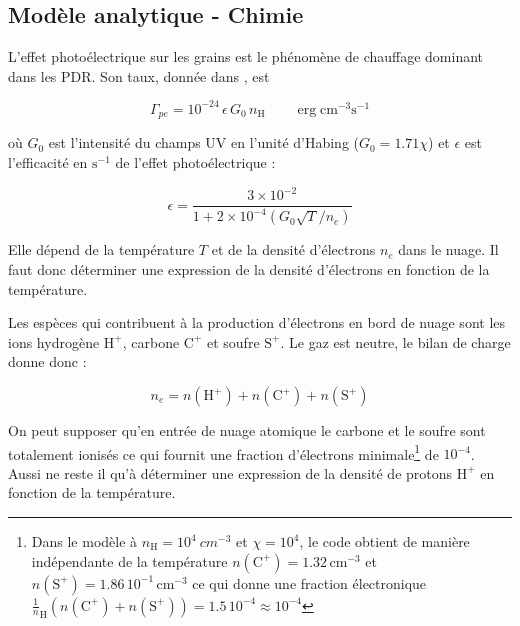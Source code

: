 \subsection{Modèle analytique - Chimie}

L'effet photoélectrique sur les grains est le phénomène de chauffage dominant dans les PDR. Son taux, donnée dans \cite{BakesTielens1994}, est 

\begin{equation}
    \Gamma_{pe} = 10^{-24}\,\epsilon\,G_0\, n_{\mathrm{H}} \qquad \operatorname{erg} \mathrm{cm}^{-3} \mathrm{s}^{-1}
\end{equation} 

où $G_0$ est l'intensité du champs UV en l'unité d'Habing ($G_0 = 1.71\chi$) et $\epsilon$ est l'efficacité en $\mathrm{s}^{-1}$ de l'effet photoélectrique : 

\begin{equation}
    \epsilon = \frac{ 3\times 10^{-2}}{1 +  2\times 10^{-4}(G_0\sqrt{T}/n_e)}
\end{equation}

Elle dépend de la température $T$ et de la densité d'électrons $n_e$ dans le nuage. Il faut donc déterminer une expression de la densité d'électrons en fonction de la température. \newline 

Les espèces qui contribuent à la production d'électrons en bord de nuage sont les ions hydrogène $\mathrm{H}^+$, carbone $\mathrm{C}^+$ et soufre $\mathrm{S}^+$. Le gaz est neutre, le bilan de charge donne donc :

\begin{equation}
    n_e = n(\mathrm{H}^+) + n(\mathrm{C}^+) + n(\mathrm{S}^+)
    \label{eq:bilan:ne}
\end{equation}


On peut supposer qu'en entrée de nuage atomique le carbone et le soufre sont totalement ionisés ce qui fournit une fraction d'électrons minimale\footnote{Dans le modèle à $n_{\mathrm{H}} = 10^4\ cm^{-3}$ et $\chi = 10^4$, le code obtient de manière indépendante de la température $n(\mathrm{C}^+) = 1.32\,\mathrm{cm}^{-3}$ et $n(\mathrm{S}^+) = 1.86\,10^{-1}\,\mathrm{cm}^{-3}$ ce qui donne une fraction électronique $\frac{1}n_\mathrm{H} (n(\mathrm{C}^+)+n(\mathrm{S}^+) ) = 1.5\,10^{-4} \approx 10^{-4}$ } de $10^{-4}$. Aussi ne reste il qu'à déterminer une expression de la densité de protons $\mathrm{H}^+$ en fonction de la température.

